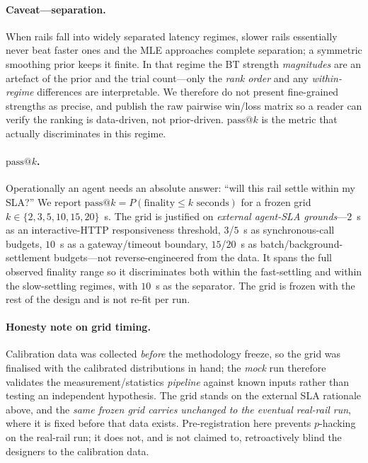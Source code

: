 \documentclass[11pt]{article}
\begin{document}
\paragraph{Caveat---separation.} When rails fall into widely separated latency regimes, slower rails
essentially never beat faster ones and the MLE approaches complete separation; a symmetric smoothing
prior keeps it finite. In that regime the BT strength \emph{magnitudes} are an artefact of the prior
and the trial count---only the \emph{rank order} and any \emph{within-regime} differences are
interpretable. We therefore do not present fine-grained strengths as precise, and publish the raw
pairwise win/loss matrix so a reader can verify the ranking is data-driven, not prior-driven.
$\mathrm{pass}@k$ is the metric that actually discriminates in this regime.

\paragraph{$\mathrm{pass}@k$.} Operationally an agent needs an absolute answer: ``will this rail settle
within my SLA?'' We report $\mathrm{pass}@k = P(\text{finality} \le k\text{ seconds})$ for a frozen
grid $k \in \{2,3,5,10,15,20\}$~s. The grid is justified on \emph{external agent-SLA grounds}---$2$~s as
an interactive-HTTP responsiveness threshold, $3$/$5$~s as synchronous-call budgets, $10$~s as a
gateway/timeout boundary, $15$/$20$~s as batch/background-settlement budgets---not reverse-engineered
from the data. It spans the full observed finality range so it discriminates both within the
fast-settling and within the slow-settling regimes, with $10$~s as the separator. The grid is frozen
with the rest of the design and is not re-fit per run.

\paragraph{Honesty note on grid timing.} Calibration data was collected \emph{before} the methodology
freeze, so the grid was finalised with the calibrated distributions in hand; the \emph{mock} run
therefore validates the measurement/statistics \emph{pipeline} against known inputs rather than testing
an independent hypothesis. The grid stands on the external SLA rationale above, and the \emph{same
frozen grid carries unchanged to the eventual real-rail run}, where it is fixed before that data
exists. Pre-registration here prevents $p$-hacking on the real-rail run; it does not, and is not claimed
to, retroactively blind the designers to the calibration data.
\end{document}
